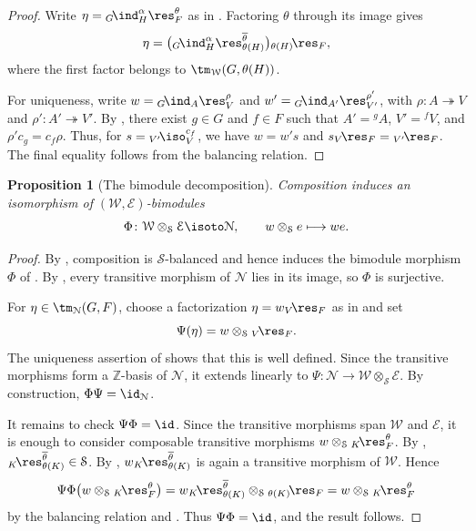 \documentclass{amsart}
\numberwithin{equation}{section}%
\newtheorem{Prop}[equation]{Proposition}
\theoremstyle{remark}
\theoremstyle{definition}
\newcommand{\lind}[1]{{}_{#1}\!\ind}
\newcommand{\lres}[1]{{}_{#1}\!\res}
\newcommand{\liso}[1]{{}_{#1}\!\iso}
\newcommand{\ol}[1]{\overline{#1}}
\begin{document}
%
\begin{proof}
Write
$\eta=\lind{G}_H^\alpha\res_F^\theta$
as in . Factoring
$\theta$ through its image gives
%
\[
\eta
=
\bigl(
\lind{G}_H^\alpha
\res_{\theta(H)}^{\ol{\theta}}
\bigr)
\lres{\theta(H)}_F,
\]
%
where the first factor belongs to
$\tm_{\mathcal W}(G,\theta(H))$.

For uniqueness, write
$w=\lind{G}_A\res_V^\rho$ and
$w'={}\lind{G}_{A'}\res_{V'}^{\rho'}$,
with $\rho\colon A\twoheadrightarrow V$ and
$\rho'\colon A'\twoheadrightarrow V'$.
By , there exist
$g\in G$ and $f\in F$ such that
$A'={}^{g}A$, $V'={}^{f}V$, and
$\rho'c_g=c_f\rho$.
Thus, for $s=\liso{V'}_V^{c_f}$,
we have
$w=w's$ and
$s\lres{V}_F=\lres{V'}_F$.
The final equality follows from the balancing relation.
\end{proof}
%
\begin{Prop}[The bimodule decomposition]
\label{prop:WE-decomposition}
Composition induces an isomorphism of
$(\mathcal W,\mathcal E)$-bimodules
%
\begin{equation}
\label{eq:WE-decomposition}
\Phi\colon
\mathcal W\otimes_{\mathcal S}\mathcal E
\isoto
\mathcal N,
\qquad
w\otimes_{\mathcal S}e\longmapsto we.
\end{equation}
\end{Prop}
%
\begin{proof}
By , composition is
$\mathcal S$-balanced and hence induces the bimodule morphism
$\Phi$ of .
By , every transitive morphism of
$\mathcal N$ lies in its image, so $\Phi$ is surjective.

For $\eta\in\tm_{\mathcal N}(G,F)$, choose a factorization
$\eta=w\lres{V}_F$ as in  and set
%
\[
\Psi(\eta)
=
w\otimes_{\mathcal S}\lres{V}_F.
\]
%
The uniqueness assertion of  shows
that this is well defined. Since the transitive morphisms form a
$\mathbb Z$-basis of $\mathcal N$, it extends linearly to
$\Psi\colon\mathcal N\to
\mathcal W\otimes_{\mathcal S}\mathcal E$.
By construction, $\Phi\Psi=\id_{\mathcal N}$.

It remains to check $\Psi\Phi=\id$.
Since the transitive morphisms span $\mathcal W$ and
$\mathcal E$, it is enough to consider
composable transitive morphisms
$w\otimes_{\mathcal S}\lres{K}_F^\theta$.
By ,
$\lres{K}_{\theta(K)}^{\ol{\theta}}\in\mathcal S$.
By ,
$w\lres{K}_{\theta(K)}^{\ol{\theta}}$
is again a transitive morphism of $\mathcal W$.
Hence
%
\[
\Psi\Phi
\bigl(
w\otimes_{\mathcal S}\lres{K}_F^\theta
\bigr)
=
w\lres{K}_{\theta(K)}^{\ol{\theta}}
\otimes_{\mathcal S}\lres{\theta(K)}_F
=
w\otimes_{\mathcal S}\lres{K}_F^\theta
\]
%
by the balancing relation and
.
Thus $\Psi\Phi=\id$, and the result follows.
\end{proof}
\end{document}
